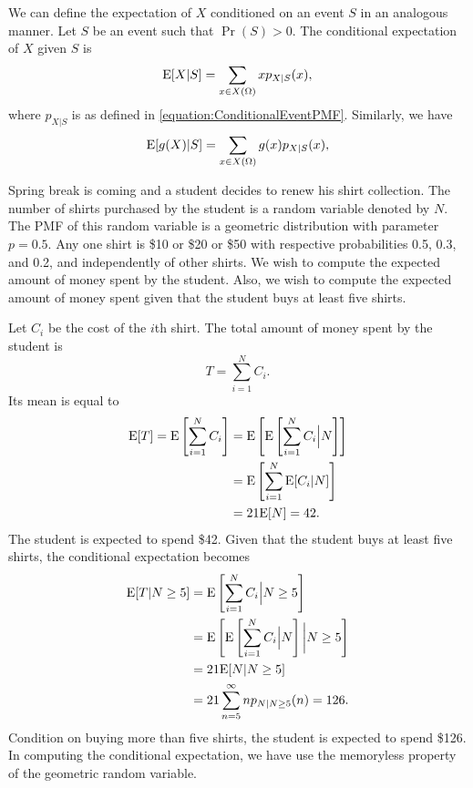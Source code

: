 We can define the expectation of $X$ conditioned on an event $S$ in an analogous manner.
Let $S$ be an event such that $\Pr (S) > 0$.
The conditional expectation of $X$ given $S$ is
\begin{equation*}
\mathrm{E} [X | S] = \sum_{x \in X(\Omega)} x p_{X|S} (x) ,
\end{equation*}
where $p_{X|S}$ is as defined in \eqref{equation:ConditionalEventPMF}.
Similarly, we have
\begin{equation*}
\mathrm{E} [g(X) | S] = \sum_{x \in X(\Omega)} g(x) p_{X|S} (x) ,
\end{equation*}

\begin{example}
Spring break is coming and a student decides to renew his shirt collection.
The number of shirts purchased by the student is a random variable denoted by $N$.
The PMF of this random variable is a geometric distribution with parameter $p = 0.5$.
Any one shirt is \$10 or \$20 or \$50 with respective probabilities 0.5, 0.3, and 0.2, and independently of other shirts.
We wish to compute the expected amount of money spent by the student.
Also, we wish to compute the expected amount of money spent given that the student buys at least five shirts.

Let $C_i$ be the cost of the $i$th shirt.
The total amount of money spent by the student is
\begin{equation*}
T = \sum_{i=1}^N C_i .
\end{equation*}
Its mean is equal to
\begin{equation*}
\begin{split}
\mathrm{E} [T] = \mathrm{E} \left[ \sum_{i=1}^N C_i \right]
&= \mathrm{E} \left[ \mathrm{E} \left[
\sum_{i=1}^N C_i \Big| N \right] \right] \\
&= \mathrm{E} \left[ \sum_{i=1}^N \mathrm{E} [ C_i | N ] \right] \\
&= 21 \mathrm{E} [ N ] = 42.
\end{split}
\end{equation*}
The student is expected to spend \$42.
Given that the student buys at least five shirts, the conditional expectation becomes
\begin{equation*}
\begin{split}
\mathrm{E} [T | N \geq 5]
&= \mathrm{E} \left[ \sum_{i=1}^N C_i \Big| N \geq 5 \right] \\
&= \mathrm{E} \left[ \mathrm{E} \left[
\sum_{i=1}^N C_i \Big| N \right] \bigg| N \geq 5 \right] \\
&= 21 \mathrm{E} [ N | N \geq 5] \\
&= 21 \sum_{n=5}^{\infty} n p_{N | N \geq 5} (n)
= 126 .
\end{split}
\end{equation*}
Condition on buying more than five shirts, the student is expected to spend \$126.
In computing the conditional expectation, we have use the memoryless property of the geometric random variable.
\end{example}



